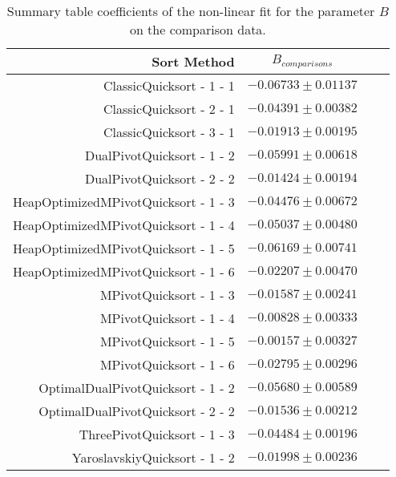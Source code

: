 		\begin{table}
			\begin{center}
				\begin{tabular}{|r|c|c|c}
					\hline
									Sort Method              &   $B_{comparisons}$      \\ \hline \hline
					                ClassicQuicksort - 1 - 1 &   $-0.06733 \pm  0.01137$ \\ \hline
					                ClassicQuicksort - 2 - 1 &   $-0.04391 \pm  0.00382$ \\ \hline
					                ClassicQuicksort - 3 - 1 &   $-0.01913 \pm  0.00195$ \\ \hline
					              DualPivotQuicksort - 1 - 2 &   $-0.05991 \pm  0.00618$ \\ \hline
					              DualPivotQuicksort - 2 - 2 &   $-0.01424 \pm  0.00194$ \\ \hline
					    HeapOptimizedMPivotQuicksort - 1 - 3 &   $-0.04476 \pm  0.00672$ \\ \hline
					    HeapOptimizedMPivotQuicksort - 1 - 4 &   $-0.05037 \pm  0.00480$ \\ \hline
					    HeapOptimizedMPivotQuicksort - 1 - 5 &   $-0.06169 \pm  0.00741$ \\ \hline
					    HeapOptimizedMPivotQuicksort - 1 - 6 &   $-0.02207 \pm  0.00470$ \\ \hline
					                 MPivotQuicksort - 1 - 3 &   $-0.01587 \pm  0.00241$ \\ \hline
					                 MPivotQuicksort - 1 - 4 &   $-0.00828 \pm  0.00333$ \\ \hline
					                 MPivotQuicksort - 1 - 5 &   $-0.00157 \pm  0.00327$ \\ \hline
					                 MPivotQuicksort - 1 - 6 &   $-0.02795 \pm  0.00296$ \\ \hline
					       OptimalDualPivotQuicksort - 1 - 2 &   $-0.05680 \pm  0.00589$ \\ \hline
					       OptimalDualPivotQuicksort - 2 - 2 &   $-0.01536 \pm  0.00212$ \\ \hline
					             ThreePivotQuicksort - 1 - 3 &   $-0.04484 \pm  0.00196$ \\ \hline
					           YaroslavskiyQuicksort - 1 - 2 &   $-0.01998 \pm  0.00236$ \\ \hline
				\end{tabular}
				\caption{Summary table coefficients of the non-linear fit for the parameter $B$ on the comparison data.}
				\label{tab:compFitCoeffB}
			\end{center}
		\end{table}

